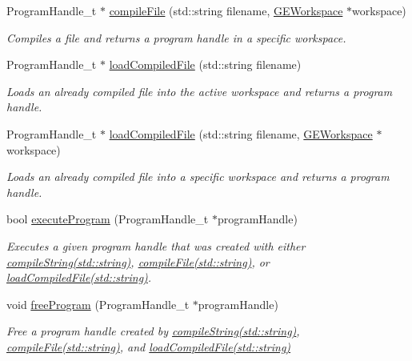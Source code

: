 \begin{DoxyCompactItemize}
Program\-Handle\-\_\-t $\ast$ \hyperlink{class_g_a_u_s_s_a85259cc52f5d47ebf79f33ab9e137ffa}{compile\-File} (std\-::string filename, \hyperlink{class_g_e_workspace}{G\-E\-Workspace} $\ast$workspace)
\begin{DoxyCompactList}\small\item\em Compiles a file and returns a program handle in a specific workspace. \end{DoxyCompactList}\item 
Program\-Handle\-\_\-t $\ast$ \hyperlink{class_g_a_u_s_s_a664d80b6f169ea22867b4a949d2fbc93}{load\-Compiled\-File} (std\-::string filename)
\begin{DoxyCompactList}\small\item\em Loads an already compiled file into the active workspace and returns a program handle. \end{DoxyCompactList}\item 
Program\-Handle\-\_\-t $\ast$ \hyperlink{class_g_a_u_s_s_aa0e49f43968782054817936c34ca6f79}{load\-Compiled\-File} (std\-::string filename, \hyperlink{class_g_e_workspace}{G\-E\-Workspace} $\ast$workspace)
\begin{DoxyCompactList}\small\item\em Loads an already compiled file into a specific workspace and returns a program handle. \end{DoxyCompactList}\item 
bool \hyperlink{class_g_a_u_s_s_a7fc9de69421c14aadb9a6310fecabcca}{execute\-Program} (Program\-Handle\-\_\-t $\ast$program\-Handle)
\begin{DoxyCompactList}\small\item\em Executes a given program handle that was created with either \hyperlink{class_g_a_u_s_s_a3ecf1522874c8ae5aa8fb8173d515b73}{compile\-String(std\-::string)}, \hyperlink{class_g_a_u_s_s_a981bdafede1af555a73b9abe05333341}{compile\-File(std\-::string)}, or \hyperlink{class_g_a_u_s_s_a664d80b6f169ea22867b4a949d2fbc93}{load\-Compiled\-File(std\-::string)}. \end{DoxyCompactList}\item 
void \hyperlink{class_g_a_u_s_s_a64c8cf4b564aea63ed8e771c969b8936}{free\-Program} (Program\-Handle\-\_\-t $\ast$program\-Handle)
\begin{DoxyCompactList}\small\item\em Free a program handle created by \hyperlink{class_g_a_u_s_s_a3ecf1522874c8ae5aa8fb8173d515b73}{compile\-String(std\-::string)}, \hyperlink{class_g_a_u_s_s_a981bdafede1af555a73b9abe05333341}{compile\-File(std\-::string)}, and \hyperlink{class_g_a_u_s_s_a664d80b6f169ea22867b4a949d2fbc93}{load\-Compiled\-File(std\-::string)} \end{DoxyCompactList}\item 

\end{DoxyCompactItemize}
